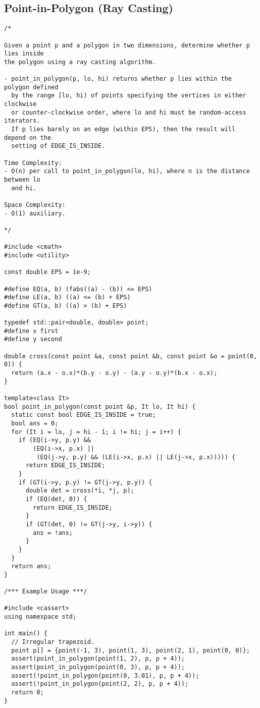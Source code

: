 \subsection{Point-in-Polygon (Ray Casting)}
\begin{lstlisting}
/*

Given a point p and a polygon in two dimensions, determine whether p lies inside
the polygon using a ray casting algorithm.

- point_in_polygon(p, lo, hi) returns whether p lies within the polygon defined
  by the range [lo, hi) of points specifying the vertices in either clockwise
  or counter-clockwise order, where lo and hi must be random-access iterators.
  If p lies barely on an edge (within EPS), then the result will depend on the
  setting of EDGE_IS_INSIDE.

Time Complexity:
- O(n) per call to point_in_polygon(lo, hi), where n is the distance between lo
  and hi.

Space Complexity:
- O(1) auxiliary.

*/

#include <cmath>
#include <utility>

const double EPS = 1e-9;

#define EQ(a, b) (fabs((a) - (b)) <= EPS)
#define LE(a, b) ((a) <= (b) + EPS)
#define GT(a, b) ((a) > (b) + EPS)

typedef std::pair<double, double> point;
#define x first
#define y second

double cross(const point &a, const point &b, const point &o = point(0, 0)) {
  return (a.x - o.x)*(b.y - o.y) - (a.y - o.y)*(b.x - o.x);
}

template<class It>
bool point_in_polygon(const point &p, It lo, It hi) {
  static const bool EDGE_IS_INSIDE = true;
  bool ans = 0;
  for (It i = lo, j = hi - 1; i != hi; j = i++) {
    if (EQ(i->y, p.y) &&
        (EQ(i->x, p.x) ||
         (EQ(j->y, p.y) && (LE(i->x, p.x) || LE(j->x, p.x))))) {
      return EDGE_IS_INSIDE;
    }
    if (GT(i->y, p.y) != GT(j->y, p.y)) {
      double det = cross(*i, *j, p);
      if (EQ(det, 0)) {
        return EDGE_IS_INSIDE;
      }
      if (GT(det, 0) != GT(j->y, i->y)) {
        ans = !ans;
      }
    }
  }
  return ans;
}

/*** Example Usage ***/

#include <cassert>
using namespace std;

int main() {
  // Irregular trapezoid.
  point p[] = {point(-1, 3), point(1, 3), point(2, 1), point(0, 0)};
  assert(point_in_polygon(point(1, 2), p, p + 4));
  assert(point_in_polygon(point(0, 3), p, p + 4));
  assert(!point_in_polygon(point(0, 3.01), p, p + 4));
  assert(!point_in_polygon(point(2, 2), p, p + 4));
  return 0;
}
\end{lstlisting}
